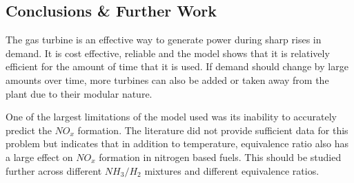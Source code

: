 \documentclass[11pt, oneside]{article}
\begin{document}
\subsection{Conclusions \& Further Work}
The gas turbine is an effective way to generate power during sharp rises in demand. It is cost effective, reliable and the model shows that it is relatively efficient for the amount of time that it is used. If demand should change by large amounts over time, more turbines can also be added or taken away from the plant due to their modular nature.

One of the largest limitations of the model used was its inability to accurately predict the $NO_x$ formation. The literature did not provide sufficient data for this problem but indicates that in addition to temperature, equivalence ratio also has a large effect on $NO_x$ formation in nitrogen based fuels. This should be studied further across different $NH_3/H_2$ mixtures and different equivalence ratios.




\end{document}
